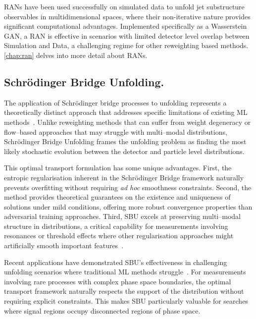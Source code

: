     RANs have been used successfully on simulated data to unfold jet substructure observables in multidimensional spaces,  where their non-iterative nature provides significant computational advantages.
    Implemented specifically as a Wasserstein GAN, a RAN is effective in scenarios with limited detector level overlap between Simulation and Data, a challenging regime for other reweighting based methods.
    \cref{chap:ran} delves into more detail about RANs.

\subsection{Schr\"odinger Bridge Unfolding.}
    The application of Schr\"odinger bridge processes to unfolding represents a theoretically distinct approach that addresses specific limitations of existing ML methods~\cite{Vargas2021SolvingBridges,Diefenbacher:2023wec}.
    Unlike reweighting methods that can suffer from weight degeneracy or flow--based approaches that may struggle with multi--modal distributions, Schr\"odinger Bridge Unfolding frames the unfolding problem as finding the most likely stochastic evolution between the detector and particle level distributions.

    This optimal transport formulation has some unique advantages.
    First, the entropic regularisation inherent in the Schr\"odinger Bridge framework naturally prevents overfitting without requiring \textit{ad hoc} smoothness constraints.
    Second, the method provides theoretical guarantees on the existence and uniqueness of solutions under mild conditions, offering more robust convergence properties than adversarial training approaches.
    Third, SBU excels at preserving multi--modal structure in distributions, a critical capability for measurements involving resonances or threshold effects where other regularisation approaches might artificially smooth important features~\cite{Butter2025GenerativeMapping}.
    
    Recent applications have demonstrated SBU's effectiveness in challenging unfolding scenarios where traditional ML methods struggle~\cite{Diefenbacher:2023wec}.
    For measurements involving rare processes with complex phase space boundaries, the optimal transport framework naturally respects the support of the distribution without requiring explicit constraints.
    This makes SBU particularly valuable for searches where signal regions occupy disconnected regions of phase space.

